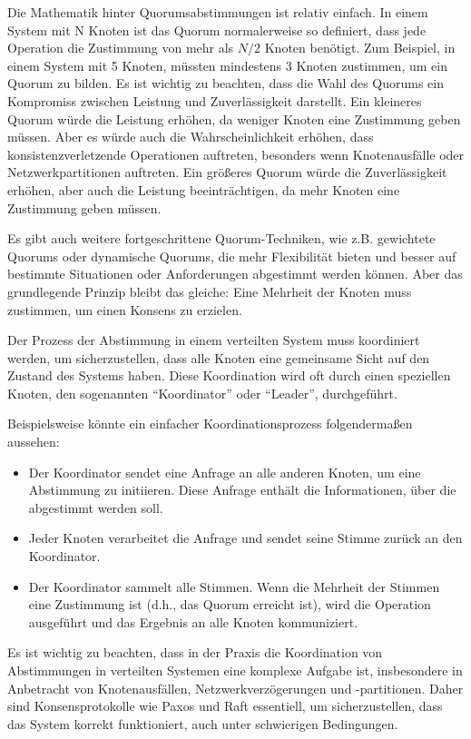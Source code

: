 \documentclass[../vs-script-first-v01.tex]{subfiles}
\begin{document}
Die Mathematik hinter Quorumsabstimmungen ist relativ einfach. In einem System mit N Knoten ist das Quorum normalerweise so definiert, dass jede Operation die Zustimmung von mehr als $N/2$ Knoten benötigt. Zum Beispiel, in einem System mit 5 Knoten, müssten mindestens 3 Knoten zustimmen, um ein Quorum zu bilden.
Es ist wichtig zu beachten, dass die Wahl des Quorums ein Kompromiss zwischen Leistung und Zuverlässigkeit darstellt. Ein kleineres Quorum würde die Leistung erhöhen, da weniger Knoten eine Zustimmung geben müssen. Aber es würde auch die Wahrscheinlichkeit erhöhen, dass konsistenzverletzende Operationen auftreten, besonders wenn Knotenausfälle oder Netzwerkpartitionen auftreten. Ein größeres Quorum würde die Zuverlässigkeit erhöhen, aber auch die Leistung beeinträchtigen, da mehr Knoten eine Zustimmung geben müssen.

Es gibt auch weitere fortgeschrittene Quorum-Techniken, wie z.B. gewichtete Quorums oder dynamische Quorums, die mehr Flexibilität bieten und besser auf bestimmte Situationen oder Anforderungen abgestimmt werden können. Aber das grundlegende Prinzip bleibt das gleiche: Eine Mehrheit der Knoten muss zustimmen, um einen Konsens zu erzielen.

Der Prozess der Abstimmung in einem verteilten System muss koordiniert werden, um sicherzustellen, dass alle Knoten eine gemeinsame Sicht auf den Zustand des Systems haben. Diese Koordination wird oft durch einen speziellen Knoten, den sogenannten \enquote{Koordinator} oder \enquote{Leader}, durchgeführt.

Beispielsweise könnte ein einfacher Koordinationsprozess folgendermaßen aussehen:
\begin{itemize}
\item Der Koordinator sendet eine Anfrage an alle anderen Knoten, um eine Abstimmung zu initiieren. Diese Anfrage enthält die Informationen, über die abgestimmt werden soll.
\item Jeder Knoten verarbeitet die Anfrage und sendet seine Stimme zurück an den Koordinator.
\item Der Koordinator sammelt alle Stimmen. Wenn die Mehrheit der Stimmen eine Zustimmung ist (d.h., das Quorum erreicht ist), wird die Operation ausgeführt und das Ergebnis an alle Knoten kommuniziert.
\end{itemize}

Es ist wichtig zu beachten, dass in der Praxis die Koordination von Abstimmungen in verteilten Systemen eine komplexe Aufgabe ist, insbesondere in Anbetracht von Knotenausfällen, Netzwerkverzögerungen und -partitionen. Daher sind Konsensprotokolle wie Paxos und Raft essentiell, um sicherzustellen, dass das System korrekt funktioniert, auch unter schwierigen Bedingungen.
\end{document}
